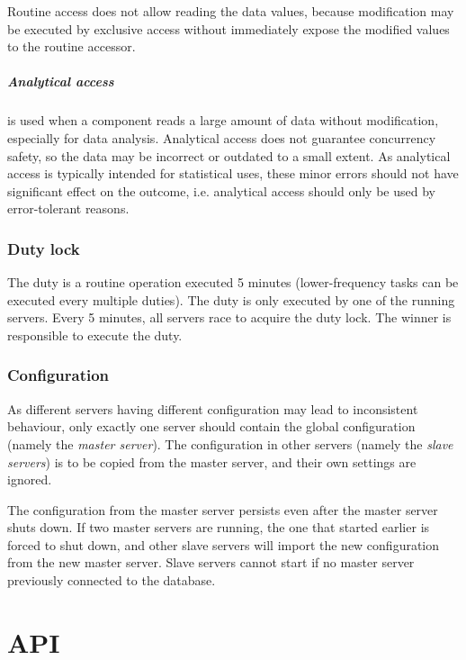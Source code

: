 \documentclass{report}
\begin{document}
						Routine access does not allow reading the data values, because modification may be executed by exclusive access
						without immediately expose the modified values to the routine accessor.

					\paragraph{Analytical access} is used when a component reads a large amount of data without modification, especially for data analysis.
					Analytical access does not guarantee concurrency safety, so the data may be incorrect or outdated to a small extent.
					As analytical access is typically intended for statistical uses, these minor errors should not have significant effect on the outcome,
					i.e. analytical access should only be used by error-tolerant reasons.

				\subsection{Duty lock}

					The duty is a routine operation executed 5 minutes (lower-frequency tasks can be executed every multiple duties).
					The duty is only executed by one of the running servers.
					Every 5 minutes, all servers race to acquire the duty lock.
					The winner is responsible to execute the duty.

				\subsection{Configuration}

					As different servers having different configuration may lead to inconsistent behaviour,
					only exactly one server should contain the global configuration (namely the \emph{master server}).
					The configuration in other servers (namely the \emph{slave servers}) is to be copied from the master server,
					and their own settings are ignored.

					The configuration from the master server persists even after the master server shuts down.
					If two master servers are running, the one that started earlier is forced to shut down,
					and other slave servers will import the new configuration from the new master server.
					Slave servers cannot start if no master server previously connected to the database.

		\chapter{API}
\end{document}
